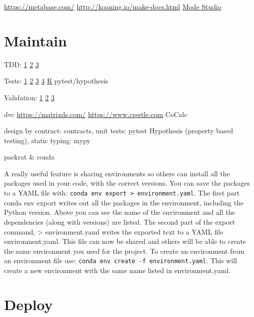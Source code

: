 \documentclass[]{book}
\begin{document}
\url{https://metabase.com/} \url{http://koaning.io/make-docs.html} \href{https://about.modeanalytics.com/}{Mode Studio}

\hypertarget{maintain}{%
\section{Maintain}\label{maintain}}

TDD: \href{http://engineering.pivotal.io/post/test-driven-development-for-data-science/}{1} \textbar{} \href{http://www.tdda.info/}{2} \textbar{} \href{http://stochasticsolutions.com/}{3}

Tests: \href{http://engineering.pivotal.io/post/test-driven-development-for-data-science/}{1} \textbar{} \href{http://www.tdda.info/}{2} \textbar{} \href{http://stochasticsolutions.com/}{3} \textbar{} \href{https://github.com/ericmjl/data-testing-tutorial}{4} \textbar{} \href{http://r-pkgs.had.co.nz/tests.html}{R} \textbar{} pytest/hypothesis

Validation: \href{https://github.com/data-cleaning/validate}{1} \textbar{} \href{https://rdrr.io/cran/checkmate/}{2} \textbar{} \href{https://github.com/shawnbrown/datatest}{3}

dvc \url{https://matrixds.com/} \textbar{} \url{https://www.crestle.com} \textbar{} CoCalc

design by contract: contracts, unit tests: pytest Hypothesis (property based testing), static typing: mypy

packrat \& conda

A really useful feature is sharing environments so others can install all the packages used in your code, with the correct versions. You can save the packages to a YAML file with: \texttt{conda\ env\ export\ \textgreater{}\ environment.yaml}.
The first part conda env export writes out all the packages in the environment, including the Python version. Above you can see the name of the environment and all the dependencies (along with versions) are listed. The second part of the export command, \textgreater{} environment.yaml writes the exported text to a YAML file environment.yaml. This file can now be shared and others will be able to create the same environment you used for the project. To create an environment from an environment file use: \texttt{conda\ env\ create\ -f\ environment.yaml}. This will create a new environment with the same name listed in environment.yaml.

\hypertarget{deploy}{%
\section{Deploy}\label{deploy}}
\end{document}
